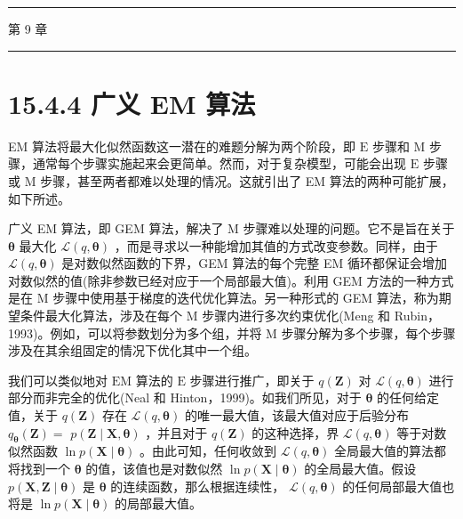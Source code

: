 \documentclass[10pt]{article}
\newcommand{\HRule}{\begin{center}\rule{0.9\linewidth}{0.2mm}\end{center}}
\begin{document}
\HRule

第 9 章

\HRule

\section*{15.4.4 广义 EM 算法}

EM 算法将最大化似然函数这一潜在的难题分解为两个阶段，即 \(\mathrm{E}\) 步骤和 \(\mathrm{M}\) 步骤，通常每个步骤实施起来会更简单。然而，对于复杂模型，可能会出现 \(\mathrm{E}\) 步骤或 \(\mathrm{M}\) 步骤，甚至两者都难以处理的情况。这就引出了 EM 算法的两种可能扩展，如下所述。

广义 EM 算法，即 GEM 算法，解决了 M 步骤难以处理的问题。它不是旨在关于 \(\mathbf{\theta }\) 最大化 \(\mathcal{L}\left( {q,\mathbf{\theta }}\right)\) ，而是寻求以一种能增加其值的方式改变参数。同样，由于 \(\mathcal{L}\left( {q,\mathbf{\theta }}\right)\) 是对数似然函数的下界，GEM 算法的每个完整 EM 循环都保证会增加对数似然的值(除非参数已经对应于一个局部最大值)。利用 GEM 方法的一种方式是在 M 步骤中使用基于梯度的迭代优化算法。另一种形式的 GEM 算法，称为期望条件最大化算法，涉及在每个 M 步骤内进行多次约束优化(Meng 和 Rubin，1993)。例如，可以将参数划分为多个组，并将 \(\mathrm{M}\) 步骤分解为多个步骤，每个步骤涉及在其余组固定的情况下优化其中一个组。

我们可以类似地对 \(\mathrm{{EM}}\) 算法的 \(\mathrm{E}\) 步骤进行推广，即关于 \(q\left( \mathbf{Z}\right)\) 对 \(\mathcal{L}\left( {q,\mathbf{\theta }}\right)\) 进行部分而非完全的优化(Neal 和 Hinton，1999)。如我们所见，对于 \(\mathbf{\theta }\) 的任何给定值，关于 \(q\left( \mathbf{Z}\right)\) 存在 \(\mathcal{L}\left( {q,\mathbf{\theta }}\right)\) 的唯一最大值，该最大值对应于后验分布 \({q}_{\mathbf{\theta }}\left( \mathbf{Z}\right)  =\)  \(p\left( {\mathbf{Z} \mid  \mathbf{X},\mathbf{\theta }}\right)\) ，并且对于 \(q\left( \mathbf{Z}\right)\) 的这种选择，界 \(\mathcal{L}\left( {q,\mathbf{\theta }}\right)\) 等于对数似然函数 \(\ln p\left( {\mathbf{X} \mid  \mathbf{\theta }}\right)\) 。由此可知，任何收敛到 \(\mathcal{L}\left( {q,\mathbf{\theta }}\right)\) 全局最大值的算法都将找到一个 \(\mathbf{\theta }\) 的值，该值也是对数似然 \(\ln p\left( {\mathbf{X} \mid  \mathbf{\theta }}\right)\) 的全局最大值。假设 \(p\left( {\mathbf{X},\mathbf{Z} \mid  \mathbf{\theta }}\right)\) 是 \(\mathbf{\theta }\) 的连续函数，那么根据连续性， \(\mathcal{L}\left( {q,\mathbf{\theta }}\right)\) 的任何局部最大值也将是 \(\ln p\left( {\mathbf{X} \mid  \mathbf{\theta }}\right)\) 的局部最大值。
\end{document}
